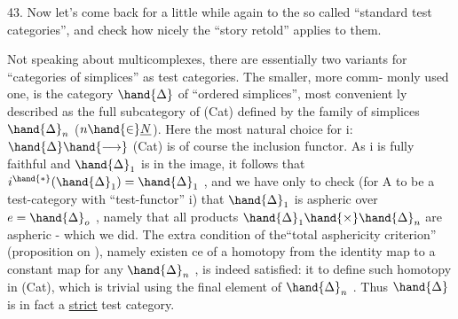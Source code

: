 
43.   Now let's come back for a little while again to the so called ``standard
test categories'', and check how nicely the ``story retold'' applies to them.

Not speaking about multicomplexes, there are essentially two variants
for ``categories of simplices'' as test categories. The smaller, more comm-%
monly used one, is the category $\hand{\Delta}$ of ``ordered simplices'', most convenient%
ly described as the full subcategory of (Cat) defined by the family of
simplices $\hand{\Delta}_n$ ($n \hand{\in} \underline{N}$). Here the most natural choice for i: $\hand{\Delta} \hand{\longrightarrow}$ (Cat) is
of course the inclusion functor.  As i is fully faithful and $\hand{\Delta}_1$ is in the image, it follows
that $i^{\hand{*}}(\hand{\Delta}_1) = \hand{\Delta}_1$ , and we have only to check (for A to be a test-category
with ``test-functor'' i) that $\hand{\Delta}_1$ is  aspheric over $e=\hand{\Delta}_o$ , namely that
all products $\hand{\Delta}_1 \hand{\times} \hand{\Delta}_n$ are aspheric - which we did. The extra condition
of the``total asphericity criterion'' (proposition on ), namely existen%
\hand{-}ce of a homotopy  from the  identity map to a constant map\hand{,} for any
$\hand{\Delta}_n$ , is indeed satisfied: it   to define such homotopy
in (Cat), which is trivial using the final element of $\hand{\Delta}_n$ . Thus $\hand{\Delta}$ is
in fact a \uline{strict} test category.

